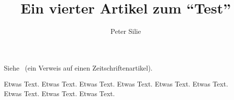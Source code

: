\documentclass{dtk2}
\author{Peter Silie}
\begin{document}
\title{Ein vierter Artikel zum "`Test"'}

\maketitle

Siehe~\cite{Niepraschk-dtk15.1:niepraschk.voss:texlivelist} (ein Verweis auf
einen Zeitschriftenartikel).

Etwas Text. Etwas Text. Etwas Text. Etwas Text. Etwas Text. Etwas Text.
Etwas Text. Etwas Text. Etwas Text.



\end{document}
